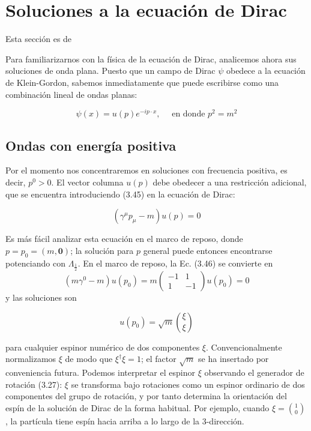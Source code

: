 \section{Soluciones a la ecuación de Dirac}
\begin{center}
  \large Esta sección es de \cite{peskin_schroeder_1995}
\end{center}
Para familiarizarnos con la física de la ecuación de Dirac, analicemos ahora sus soluciones de onda plana. Puesto que un campo de Dirac $\psi$ obedece a la ecuación de Klein-Gordon, sabemos inmediatamente que puede escribirse como una combinación lineal de ondas planas:

\begin{equation*}
\psi(x)=u(p) e^{-i p \cdot x}, \quad \text { en donde } p^{2}=m^{2} \tag{3.45}
\end{equation*}

\subsection{Ondas con energía positiva}
Por el momento nos concentraremos en soluciones con frecuencia positiva, es decir, $p^{0}>0$. El vector columna $u(p)$ debe obedecer a una restricción adicional, que se encuentra introduciendo (3.45) en la ecuación de Dirac:

\begin{equation*}
\left(\gamma^{\mu} p_{\mu}-m\right) u(p)=0 \tag{3.46}
\end{equation*}


Es más fácil analizar esta ecuación en el marco de reposo, donde $p=p_{0}=(m, \mathbf{0})$; la solución para $p$ general puede entonces encontrarse potenciando con $\Lambda_{\frac{1}{2}}$. En el marco de reposo, la Ec. (3.46) se convierte en
$$
\left(m \gamma^{0}-m\right) u\left(p_{0}\right)=m\left(\begin{array}{rr}
-1 & 1 \\
1 & -1
\end{array}\right) u\left(p_{0}\right)=0
$$
y las soluciones son

\begin{equation*}
u\left(p_{0}\right)=\sqrt{m}\binom{\xi}{\xi} \tag{3.47}
\end{equation*}

para cualquier espinor numérico de dos componentes $\xi$. Convencionalmente normalizamos $\xi$ de modo que $\xi^{\dagger} \xi=1$; el factor $\sqrt{m}$ se ha insertado por conveniencia futura. Podemos interpretar el espinor $\xi$ observando el generador de rotación (3.27): $\xi$ se transforma bajo rotaciones como un espinor ordinario de dos componentes del grupo de rotación, y por tanto determina la orientación del espín de la solución de Dirac de la forma habitual. Por ejemplo, cuando $\xi=\binom{1}{0}$, la partícula tiene espín hacia arriba a lo largo de la 3-dirección.



